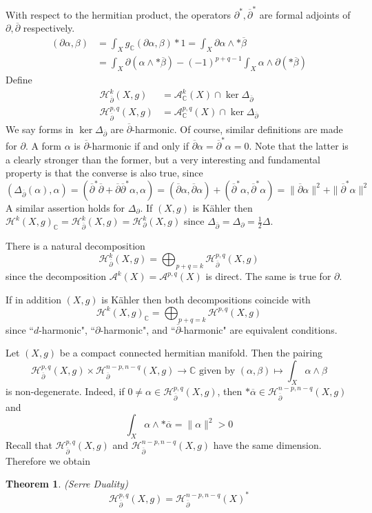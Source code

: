 \documentclass[12pt]{article}
\theoremstyle{plain}
\newtheorem{theorem}[equation]{Theorem}
\theoremstyle{definition}
\newcommand{\IC}{\mathbb{C}}
\newcommand{\<}{\langle}
\renewcommand{\>}{\rangle}
\newcommand{\p}{\partial}
\newcommand{\sH}{\mathcal{H}}
\newcommand{\bp}{\overline{\p}}
\newcommand{\sA}{\mathcal{A}}
\newcommand{\bpL}{\Delta_{\overline{\p}}}
\newcommand{\pL}{\Delta_{\p}}
\begin{document}
With respect to the hermitian product, the operators $\p^*, \bp^*$ are formal adjoints of $\p, \bp$ respectively. 
\begin{align*}
(\p \alpha, \beta) &= \int_X g_\IC(\p \alpha, \beta) *1 = \int_X \p \alpha \wedge * \overline{\beta} \\
&= \int_X \p(\alpha \wedge * \overline{\beta})  - (-1)^{p + q - 1} \int_X \alpha \wedge \p (* \overline{\beta}) 
\end{align*}
Define 
\begin{align*}
\sH_{\overline{\p}}^k(X, g) &= \sA^k_\IC(X) \cap \ker \Delta_{\overline{\p}} \\
\sH_{\overline{\p}}^{p, q}(X, g) &= \sA^{p, q}_\IC(X) \cap \ker \Delta_{\overline{\p}}
\end{align*} We say forms in $\ker \Delta_{\bp}$ are $\bp$-harmonic. Of course, similar definitions are made for $\p$.
A form $\alpha$ is $\bp$-harmonic if and only if $\bp \alpha = \bp^* \alpha = 0$. Note that the latter is a clearly stronger than the former, but a very interesting and fundamental property is that the converse is also true, since $$ (\bpL(\alpha), \alpha) = ( \bp^* \bp + \bp \bp^* \alpha, \alpha) = (\bp \alpha, \bp \alpha) + (\bp^* \alpha, \bp^* \alpha) = \| \bp \alpha \|^2 + \| \bp^* \alpha \|^2 $$
A similar assertion holds for $\pL$. 
If $(X, g)$ is K{\"a}hler then $\sH^k(X, g)_\IC = \sH_{\bp}^k(X, g) = \sH_{\p}^k(X, g)$ since $\bpL = \pL = \frac{1}{2} \Delta $. 

There is a natural decomposition 
$$ \sH^k_{\bp} (X, g) = \bigoplus_{p + q = k} \sH^{p, q}_{\bp} (X, g) $$
since the decomposition $\sA^k(X) = \sA^{p, q}(X)$ is direct. The same is true for $\p$. 

If in addition $(X, g)$ is K{\"a}hler then both decompositions coincide with $$\sH^k(X, g)_\IC = \bigoplus_{p + q = k} \sH^{p, q}(X, g)$$
since ``$d$-harmonic", ``$\p$-harmonic", and ``$\bp$-harmonic" are equivalent conditions. 

Let $(X, g)$ be a compact connected hermitian manifold. Then the pairing 
$$ \sH_{\bp}^{p, q}(X, g) \times \sH_{\bp}^{n - p, n - q}(X, g) \to \IC \text{ given by } (\alpha, \beta) \mapsto \int_X \alpha \wedge \beta $$
is non-degenerate. Indeed, if $0 \neq \alpha \in \sH_{\bp}^{p, q}(X, g)$, then $* \overline{\alpha} \in \sH_{\bp}^{n - p, n - q}(X, g)$ and 
$$ \int_X \alpha \wedge * \overline{\alpha} = \| \alpha \|^2 > 0 $$
Recall that $\sH_{\bp}^{p, q}(X, g)$ and $\sH_{\bp}^{n - p, n - q}(X, g)$ have the same dimension. Therefore we obtain 
\begin{theorem}
\emph{(Serre Duality)}
$$ \sH_{\bp}^{p, q}(X, g) = \sH^{n -p, n - q}_{\bp}(X)^* $$
\end{theorem}
\end{document}
